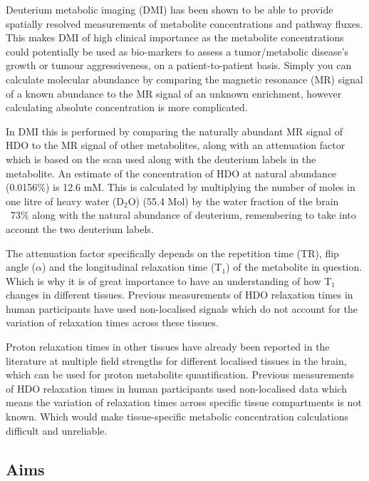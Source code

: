 \documentclass[class=article, crop=false]{standalone}
\begin{document}
Deuterium metabolic imaging (DMI) has been shown to be able to provide spatially resolved measurements of metabolite concentrations and pathway fluxes\cite{Kreis2020MeasuringMRI,Lu2017QuantitativeSpectroscopy}. This makes DMI of high clinical importance as the metabolite concentrations could potentially be used as bio-markers to assess a tumor/metabolic disease's growth or tumour aggressiveness, on a patient-to-patient basis. Simply you can calculate molecular abundance by comparing the magnetic resonance (MR) signal of a known abundance to the MR signal of an unknown enrichment, however calculating absolute concentration is more complicated. 

In DMI this is performed by comparing the naturally abundant MR signal of HDO to the MR signal of other metabolites, along with an attenuation factor which is based on the scan used along with the deuterium labels in the metabolite. An estimate of the concentration of HDO at natural abundance (0.0156\%) is 12.6 mM. This is calculated by multiplying the number of moles in one litre of heavy water (D$_{2}$O) (55.4 Mol) by the water fraction of the brain ~73\% along with the natural abundance of deuterium, remembering to take into account the two deuterium labels.

The attenuation factor specifically depends on the repetition time (TR), flip angle ($\alpha$) and the longitudinal relaxation time (T$_1$) of the metabolite in question. Which is why it is of great importance to have an understanding of how T$_1$ changes in different tissues. Previous measurements of HDO relaxation times in human participants have used non-localised signals\cite{DeFeyter2018DeuteriumVivo,DeFeyter2021DeuteriumFuture,Ruhm2021DeuteriumResolution} which do not account for the variation of relaxation times across these tissues.

Proton relaxation times in other tissues have already been reported in the literature at multiple field strengths for different localised tissues in the brain\cite{Wright2008WaterOptimization}, which can be used for proton metabolite quantification. Previous measurements of HDO relaxation times in human participants used non-localised data\cite{DeFeyter2018DeuteriumVivo, Ruhm2022Dynamic9.4T, Gursan2022ResidualMuscle} which means the variation of relaxation times across specific tissue compartments is not known. Which would make tissue-specific metabolic concentration calculations difficult and unreliable.  

\subsection{Aims}
\end{document}
